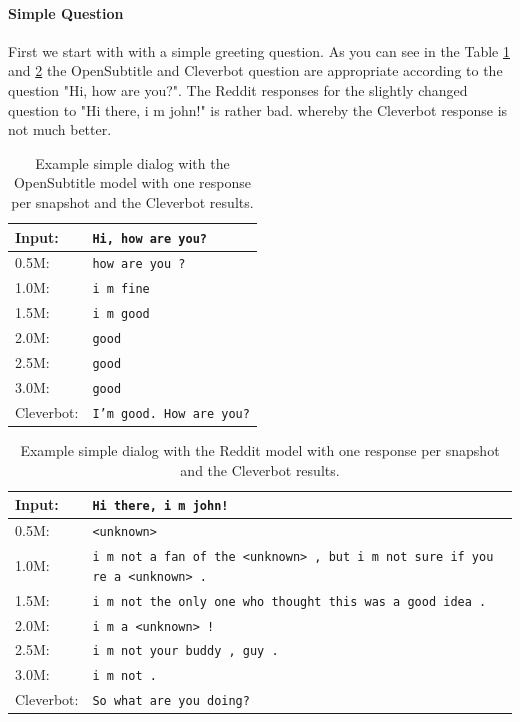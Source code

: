 \paragraph{Simple Question}First we start with with a simple greeting question. As you can see in the Table  \ref{results:example1_output:OpenSubtitle_compared} and \ref{results:example1_output:Reddit_compared} the OpenSubtitle and Cleverbot question are appropriate according to the question "Hi, how are you?". The Reddit responses for the slightly changed question to "Hi there, i m john!" is rather bad. whereby the Cleverbot response is not much better.
\begin{table}[H]
	\centering
	\begin{adjustbox}{max width=\textwidth}
		\begin{tabular}{ll}
			\toprule
			Input: 	& \texttt{Hi, how are you?}\\
			\midrule
			0.5M: 	& \texttt{how are you ?}\\
			1.0M: 	& \texttt{i m fine}\\
			1.5M:	& \texttt{i m good}\\
			2.0M:	& \texttt{good}\\
			2.5M:	& \texttt{good}\\
			3.0M:	& \texttt{good}\\
			Cleverbot:	& \texttt{I'm good. How are you?}\\
			\bottomrule
		\end{tabular}
	\end{adjustbox}
\caption{Example simple dialog with the OpenSubtitle model with one response per snapshot and the Cleverbot results.}
\label{results:example1_output:OpenSubtitle_compared}
\end{table}
\begin{table}[H]
	\centering
	\begin{adjustbox}{max width=\textwidth}
		\begin{tabular}{ll}
			\toprule
			Input: 	& \texttt{Hi there, i m john!}\\
			\midrule
			0.5M:	& \texttt{<unknown>}\\
			1.0M: 	& \texttt{i m not a fan of the <unknown> , but i m not sure if you re a <unknown> .}\\
			1.5M: 	& \texttt{i m not the only one who thought this was a good idea .}\\
			2.0M:	& \texttt{i m a <unknown> !}\\
			2.5M:	& \texttt{i m not your buddy , guy .}\\
			3.0M:	& \texttt{i m not .}\\
			Cleverbot:	& \texttt{So what are you doing?}\\
			\bottomrule
		\end{tabular}
	\end{adjustbox}
	\caption{Example simple dialog with the Reddit model with one response per snapshot and the Cleverbot results.}
	\label{results:example1_output:Reddit_compared}
\end{table}

